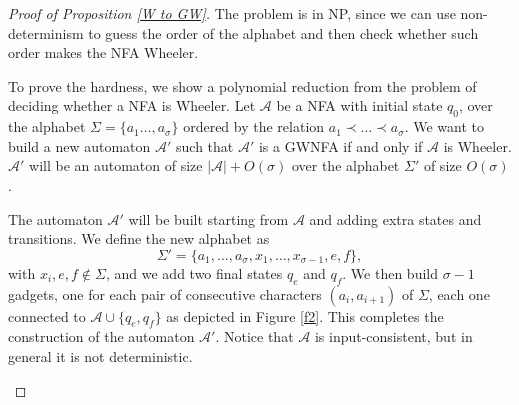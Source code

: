 \documentclass[runningheads]{llncs}
\begin{document}
\begin{proof}[\noindent Proof of Proposition \ref{W to GW}]
The problem is in NP, since we can use non-determinism to guess the order of the alphabet and then check whether such order makes the NFA Wheeler.

To prove the hardness, we show a polynomial reduction from the problem of deciding whether a NFA is Wheeler. Let $\mathcal A$ be a NFA with initial state $q_0$, over the alphabet $\Sigma=\{a_1\dots,a_\sigma\}$ ordered by the relation $a_1\prec\dots\prec a_\sigma$. We want to build a new automaton $\mathcal A'$ such that $\mathcal A'$ is a GWNFA if and only if $\mathcal A$ is Wheeler. $\mathcal{A}'$ will be an automaton of size $|\mathcal{A}|+O(\sigma)$ over the alphabet $\Sigma'$ of size $O(\sigma)$. 

The automaton $\mathcal A'$ will be built starting from $\mathcal A$ and adding extra states and transitions. We define the new alphabet as
\[ \Sigma' = \{ a_1, \dots , a_\sigma, x_1, \dots, x_{\sigma-1}, e, f \}, \]
with $x_i, e, f \notin \Sigma $, and we add two final states $q_e$ and $q_f$. We then build $\sigma-1$ gadgets, one for each pair of consecutive characters $(a_i, a_{i+1})$ of $\Sigma$, each one connected to $\mathcal A \cup \{ q_e, q_f \}$ as depicted in Figure \ref{f2}. This completes the construction of the automaton $\mathcal A'$. Notice that $\mathcal A$ is input-consistent, but in general it is not deterministic.

\begin{figure}
\begin{center}
\end{center}
\end{figure}
\end{proof}
\end{document}
